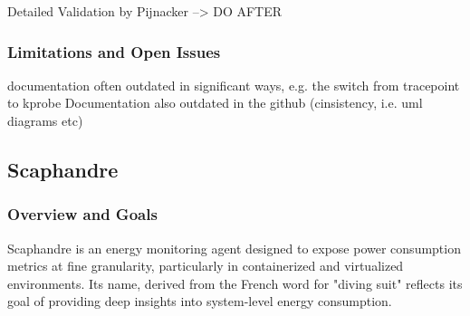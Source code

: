 Detailed Validation by Pijnacker\parencite{pijnackerEstimatingContainerlevelPower2024, pijnackerContainerlevelEnergyObservability2025}
--> DO AFTER

\subsubsection{Limitations and Open Issues}
\label{sec:kepler-limitations}

documentation often outdated in significant ways, e.g. the switch from tracepoint to kprobe
Documentation also outdated in the github (cinsistency, i.e. uml diagrams etc)


































\subsection{Scaphandre}
\label{sec:scaphandre}

\subsubsection{Overview and Goals}
\label{sec:scaphandre-overview}

Scaphandre\parencite{scaphandre_github} is an energy monitoring agent designed to expose power consumption metrics at fine granularity, particularly in containerized and virtualized environments. Its name, derived from the French word for "diving suit" reflects its goal of providing deep insights into system-level energy consumption.


